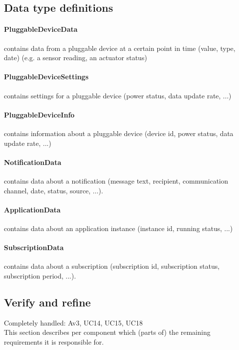 \subsection{Data type definitions}
    \paragraph{PluggableDeviceData}
              contains data from a pluggable device at a certain point in time
              (value, type, date) (e.g. a sensor reading, an actuator status)
    \paragraph{PluggableDeviceSettings}
              contains settings for a pluggable device (power status,
              data update rate, ...)
    \paragraph{PluggableDeviceInfo}
              contains information about a pluggable device (device id,
              power status, data update rate, ...)

    \paragraph{NotificationData}
              contains data about a notification (message text, recipient,
              communication channel, date, status, source, ...).

    \paragraph{ApplicationData}
              contains data about an application instance (instance id, running status, ...)
    \paragraph{SubscriptionData}
              contains data about a subscription (subscription id, subscription status,
              subscription period, ...).


\subsection{Verify and refine}
    Completely handled: Av3, UC14, UC15, UC18 \\

    \noindent This section describes per component which (parts of) the remaining
    requirements it is responsible for.

